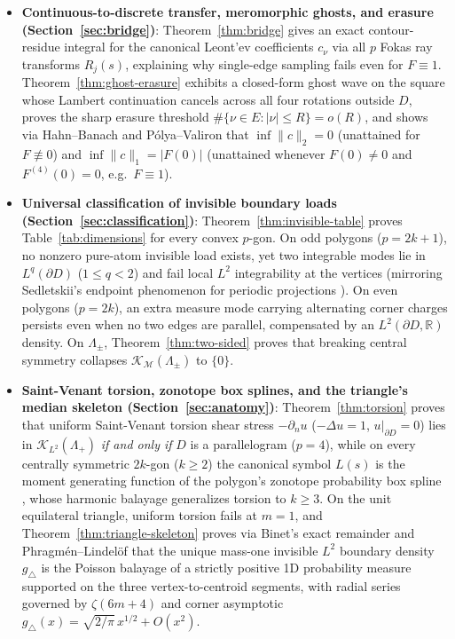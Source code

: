 \documentclass[11pt,reqno]{amsart}
\theoremstyle{definition}
\theoremstyle{remark}
\newcommand{\R}{\mathbb{R}}
\begin{document}
\begin{itemize}
  \item \textbf{Continuous-to-discrete transfer, meromorphic ghosts, and erasure (Section~\ref{sec:bridge})}: Theorem~\ref{thm:bridge} gives an exact contour-residue integral for the canonical Leont'ev coefficients $c_\nu$ via all $p$ Fokas ray transforms $R_j(s)$, explaining why single-edge sampling fails even for $F \equiv 1$. Theorem~\ref{thm:ghost-erasure} exhibits a closed-form ghost wave on the square whose Lambert continuation cancels across all four rotations outside $D$, proves the sharp erasure threshold $\#\{\nu \in E : |\nu|\le R\} = o(R)$, and shows via Hahn--Banach and P\'olya--Valiron that $\inf \|c\|_2 = 0$ (unattained for $F \not\equiv 0$) and $\inf \|c\|_1 = |F(0)|$ (unattained whenever $F(0)\ne 0$ and $F^{(4)}(0)=0$, e.g.\ $F \equiv 1$).
  \item \textbf{Universal classification of invisible boundary loads (Section~\ref{sec:classification})}: Theorem~\ref{thm:invisible-table} proves Table~\ref{tab:dimensions} for every convex $p$-gon. On odd polygons ($p=2k+1$), no nonzero pure-atom invisible load exists, yet two integrable modes lie in $L^q(\partial D)$ ($1 \le q < 2$) and fail local $L^2$ integrability at the vertices (mirroring Sedletskii's endpoint phenomenon for periodic projections \cite{Sedletskii1978,Sedletskii1988}). On even polygons ($p=2k$), an extra measure mode carrying alternating corner charges persists even when no two edges are parallel, compensated by an $L^2(\partial D, \R)$ density. On $\Lambda_\pm$, Theorem~\ref{thm:two-sided} proves that breaking central symmetry collapses $\mathcal{K}_{\mathcal{M}}(\Lambda_\pm)$ to $\{0\}$.
  \item \textbf{Saint-Venant torsion, zonotope box splines, and the triangle's median skeleton (Section~\ref{sec:anatomy})}: Theorem~\ref{thm:torsion} proves that uniform Saint-Venant torsion shear stress $-\partial_n u$ ($-\Delta u = 1$, $u|_{\partial D}=0$) lies in $\mathcal{K}_{L^2}(\Lambda_+)$ \emph{if and only if} $D$ is a parallelogram ($p=4$), while on every centrally symmetric $2k$-gon ($k \ge 2$) the canonical symbol $L(s)$ is the moment generating function of the polygon's zonotope probability box spline \cite{BoxSplines}, whose harmonic balayage generalizes torsion to $k \ge 3$. On the unit equilateral triangle, uniform torsion fails at $m=1$, and Theorem~\ref{thm:triangle-skeleton} proves via Binet's exact remainder and Phragm\'en--Lindel\"of that the unique mass-one invisible $L^2$ boundary density $g_\triangle$ is the Poisson balayage of a strictly positive 1D probability measure supported on the three vertex-to-centroid segments, with radial series governed by $\zeta(6m+4)$ and corner asymptotic $g_\triangle(x) = \sqrt{2/\pi}\,x^{1/2} + O(x^2)$.

\end{itemize}
\end{document}
